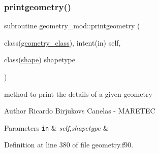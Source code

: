 \subsubsection{\texorpdfstring{printgeometry()}{printgeometry()}}
{\footnotesize\ttfamily subroutine geometry\+\_\+mod\+::printgeometry (\begin{DoxyParamCaption}\item[{class(\mbox{\hyperlink{structgeometry__mod_1_1geometry__class}{geometry\+\_\+class}}), intent(in)}]{self,  }\item[{class(\mbox{\hyperlink{structgeometry__mod_1_1shape}{shape}})}]{shapetype }\end{DoxyParamCaption})\hspace{0.3cm}{\ttfamily [private]}}



method to print the details of a given geometry 

\begin{DoxyAuthor}{Author}
Ricardo Birjukovs Canelas -\/ M\+A\+R\+E\+T\+EC 
\end{DoxyAuthor}

\begin{DoxyParams}[1]{Parameters}
\mbox{\tt in}  & {\em self,shapetype} & \\
\hline
\end{DoxyParams}


Definition at line 380 of file geometry.\+f90.


